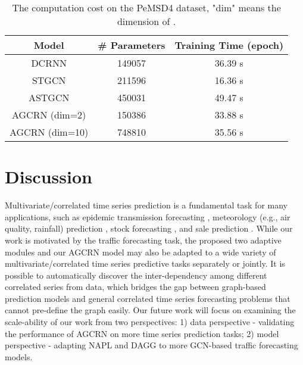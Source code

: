 \documentclass{article}
\begin{document}
\begin{table}[h]
\caption{The computation cost on the PeMSD4 dataset, "dim" means the dimension of \bm{}.}
\label{cost}
\centering
\begin{tabular}{@{}ccc@{}}
\toprule
Model          & \# Parameters & Training Time (epoch) \\ \midrule
DCRNN          & 149057        & 36.39 s               \\ \midrule
STGCN          & 211596        & 16.36 s               \\ \midrule
ASTGCN         & 450031        & 49.47 s               \\ \midrule
AGCRN (dim=2)  & 150386        & 33.88 s               \\ \midrule
AGCRN (dim=10) & 748810        & 35.56 s               \\ \bottomrule
\end{tabular}
\end{table}

\section{Discussion}
Multivariate/correlated time series prediction is a fundamental task for many applications, such as epidemic transmission forecasting \cite{epideep-2019kdd}, meteorology (e.g., air quality, rainfall) prediction \cite{airquality}, stock forecasting \cite{stock-tao2019}, and sale prediction \cite{sales-cikm2019}.
While our work is motivated by the traffic forecasting task, the proposed two adaptive modules and our AGCRN model may also be adapted to a wide variety of multivariate/correlated time series predictive tasks separately or jointly. 
It is possible to automatically discover the inter-dependency among different correlated series from data, which bridges the gap between graph-based prediction models and general correlated time series forecasting problems that cannot pre-define the graph easily. 
Our future work will focus on examining the scale-ability of our work from two perspectives: 1) data perspective - validating the performance of AGCRN on more time series prediction tasks; 2) model perspective - adapting NAPL and DAGG to more GCN-based traffic forecasting models. 
\end{document}
